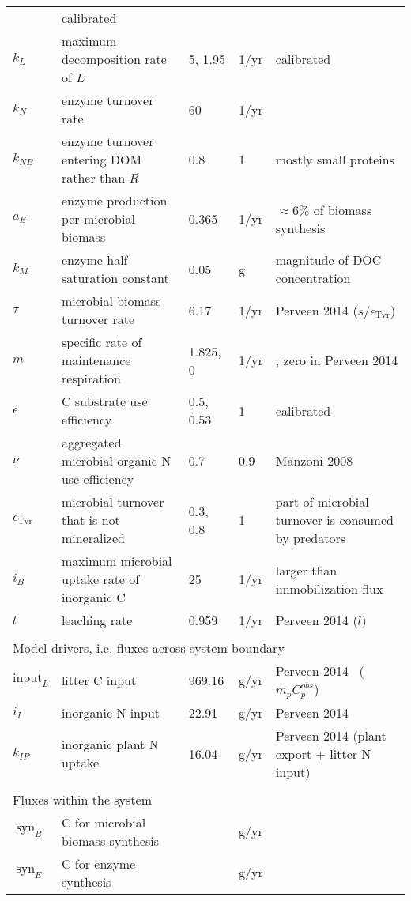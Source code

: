 \begin{table}[t]
\begin{tabular}{lp{6cm}llp{5.5cm}}
& calibrated \\
$k_L$ &  maximum decomposition rate of $L$ &  5, 1.95 & 1/yr
& calibrated \\
$k_N$ &  enzyme turnover rate &  60 & 1/yr & \citep{Burns13} \\
$k_{NB}$ & enzyme turnover entering DOM rather than $R$ & 
0.8 & 1 & mostly small proteins \\
$a_{E}$ &  enzyme production per microbial biomass & 0.365 &
1/yr & $\approx 6\%$ of biomass synthesis \\ 
$k_{M}$ &  enzyme half saturation constant & 0.05 & g & magnitude of DOC
concentration \\
$\tau$ &  microbial biomass turnover rate & 6.17 & 1/yr & Perveen 2014
($s/\epsilon_{\operatorname{Tvr}}$) \\
$m$ & specific rate of maintenance respiration & 1.825, 0 & 
1/yr & \citep{Bodegom07}, zero in Perveen 2014 \\
$\epsilon$ & C substrate use efficiency & 0.5, 0.53 &
1 & calibrated \\ %
$\nu$ & aggregated microbial organic N use efficiency & 0.7 &
0.9 & Manzoni 2008 \\
$\epsilon_{\operatorname{Tvr}}$ & microbial turnover that is not
mineralized & 0.3,\,0.8 & 1 & part of microbial turnover is consumed by
predators
\\
$i_{B}$ & maximum microbial uptake rate of inorganic C & 25 & 1/yr 
& larger than immobilization flux \\
$l$ & leaching rate & 0.959 &
1/yr & Perveen 2014 ($l)$ \\
\\
\multicolumn{5}{l}{Model drivers, i.e. fluxes across system boundary}  \\ 
$\mathrm{input}_{L}$ & litter C input & 969.16 & g/yr 
& Perveen 2014 \, ($m_p C^{obs}_p$)\\
$i_{I}$ & inorganic N input & 22.91 & g/yr 
& Perveen 2014 \\
$k_{IP}$ & inorganic plant N uptake & 16.04 &  g/yr 
& Perveen 2014 (plant export + litter N input)\\
\\
\multicolumn{5}{l}{Fluxes within the system} \\
$\operatorname{syn}_B $ & C for microbial biomass synthesis &  & g/yr &
\\
$\operatorname{syn}_E $ & C for enzyme synthesis &  & g/yr & \\

\end{tabular}
\end{table}
